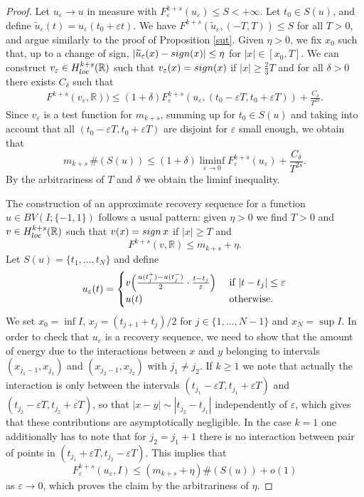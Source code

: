 \documentclass[10pt,a4paper]{amsart}
\newcommand{\e}{\varepsilon}
\begin{document}
\begin{proof} Let $u_\e\to u$ in measure with $F^{k+s}_\e(u_\e)\le S<+\infty$. Let $t_0\in S(u)$, and define 
$\widetilde u_\e(t) = u_\e(t_0+\e t)$. We have $F^{k+s}(\widetilde u_\e, (-T,T))\le S$ for all $T>0$, and argue similarly to the proof of  Proposition \rm\ref{sut}. Given $\eta>0$, we fix $x_0$ such that, up to a change of sign, $|\widetilde u_\e(x)-{\rm sign}(x)|\le \eta$ for $|x|\in[x_0, T]$. We can construct $v_\e\in H^{k+s}_{\rm loc}(\mathbb R)$ such that $v_\e(x)={\rm sign}(x)$ if $|x|\ge \frac23 T$ and for all $\delta>0$ there exists $C_\delta$ such that 
\begin{eqnarray*}\nonumber
F^{k+s}(v_\e,\mathbb R))\le (1+\delta) F^{k+s}_\e(u_\e,(t_0-\e T,t_0+\e T)) +\frac{C_\delta}{T^{2s}}.
\end{eqnarray*}
Since $v_\e$ is a test function for $m_{k+s}$, summing up for $t_0\in S(u)$ and taking into account that all $(t_0-\e T,t_0+\e T)$ are disjoint for $\e$ small enough, we obtain that
$$
m_{k+s}\,\#(S(u))\le  (1+\delta) \liminf_{\e\to 0} F^{k+s}_\e(u_\e) + \frac{C_\delta}{T^{2s}}.
$$
By the arbitrariness of $T$ and $\delta$ we obtain the liminf inequality. 

\smallskip
The construction of an approximate recovery sequence for a function $u\in BV(I;\{-1,1\})$ follows a usual pattern:
given $\eta>0$ we find $T>0$ and $v\in H^{k+s}_{\rm loc}(\mathbb R)$ such that $v(x)={\rm sign}\, x$ if $|x| \ge T$ and 
$$
F^{k+s}(v,\mathbb R)\le m_{k+s}+\eta.
$$
Let $S(u)=\{t_1,\ldots, t_N\}$ and define 
$$
u_\e(t)=\begin{cases}
v\Big(\frac{u(t_j^+)-u(t_j^-)}2\cdot\frac{t-t_j}\e\Big) & \hbox{ if } |t-t_j|\le \e\\
u(t) & \hbox{ otherwise.}
\end{cases}
$$
We set $x_0=\inf I$, $x_j=(t_{j+1}+t_j)/2$ for $j\in\{1,\ldots, N-1\}$ and $x_N=\sup I$.
In order to check that $u_\e$ is a recovery sequence, we need to show that the amount of energy due to
the interactions between $x$ and $y$ belonging to intervals $(x_{j_1-1}, x_{j_1})$ and $(x_{j_2-1}, x_{j_2})$ with $j_1\neq j_2$. If $k\ge 1$ we note that actually the interaction is only between the intervals $(t_{j_1}-\e T,t_{j_1}+\e T)$ and $(t_{j_2}-\e T,t_{j_2}+\e T)$, so that $|x-y| \sim |t_{j_2}-t_{j_1}|$ independently of $\e$, which gives that these contributions are asymptotically negligible. In the case $k=1$ one additionally has to note that for ${j_2}={j_1}+1$ there is no interaction between pair of points in $(t_{j_1}+\e T, t_{j_2}-\e T)$. This implies that
$$
F_\e^{k+s}(u_\e,I)\le (m_{k+s}+\eta)\#(S(u)) +o(1)
$$
as $\e\to 0$, which proves the claim by the arbitrariness of $\eta$.
\end{proof}
\end{document}
